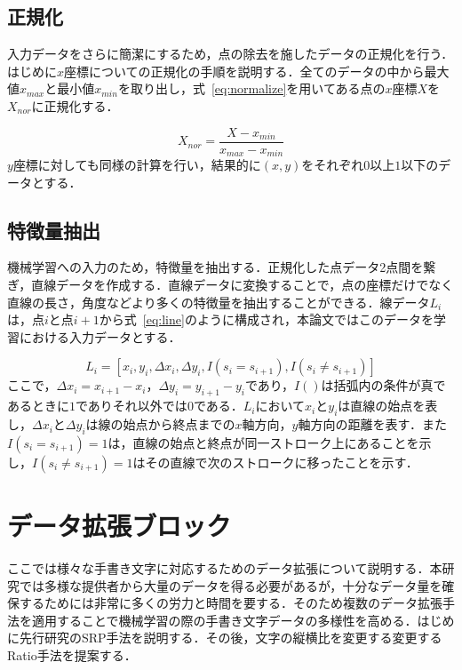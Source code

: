 \subsection{正規化}
\label{normal}
入力データをさらに簡潔にするため，点の除去を施したデータの正規化を行う．はじめに$x$座標についての正規化の手順を説明する．全てのデータの中から最大値$x_{max}$と最小値$x_{min}$を取り出し，式~\ref{eq:normalize}を用いてある点の$x$座標$X$を$X_{nor}$に正規化する．

\begin{equation}
  X_{nor} = \frac{X - x_{min}}{x_{max}-x_{min}}
  \label{eq:normalize}
\end{equation}
$y$座標に対しても同様の計算を行い，結果的に$(x, y)$をそれぞれ$0$以上$1$以下のデータとする．

\subsection{特徴量抽出}
\label{extract}
機械学習への入力のため，特徴量を抽出する．正規化した点データ2点間を繋ぎ，直線データを作成する．直線データに変換することで，点の座標だけでなく直線の長さ，角度などより多くの特徴量を抽出することができる．線データ$L_i$は，点$i$と点$i+1$から式~\ref{eq:line}のように構成され，本論文ではこのデータを学習における入力データとする．

\begin{equation}
  L_i = [x_i, y_i, \Delta{x_i}, \Delta{y_i}, I(s_i=s_{i+1}), I(s_i \neq s_{i+1})]
  \label{eq:line}
\end{equation}
ここで，$\Delta{x_i}=x_{i+1}-x_i$，$\Delta{y_i}=y_{i+1}-y_i$であり，$I()$は括弧内の条件が真であるときに$1$でありそれ以外では$0$である．$L_i$において$x_i$と$y_i$は直線の始点を表し，$\Delta{x_i}$と$\Delta{y_i}$は線の始点から終点までの$x$軸方向，$y$軸方向の距離を表す．また$I(s_i=s_{i+1})=1$は，直線の始点と終点が同一ストローク上にあることを示し，$I(s_i \neq s_{i+1})=1$はその直線で次のストロークに移ったことを示す．

\section{データ拡張ブロック}
\label{augment}
ここでは様々な手書き文字に対応するためのデータ拡張について説明する．本研究では多様な提供者から大量のデータを得る必要があるが，十分なデータ量を確保するためには非常に多くの労力と時間を要する．そのため複数のデータ拡張手法を適用することで機械学習の際の手書き文字データの多様性を高める．はじめに先行研究のSRP手法を説明する．その後，文字の縦横比を変更する変更するRatio手法を提案する．

